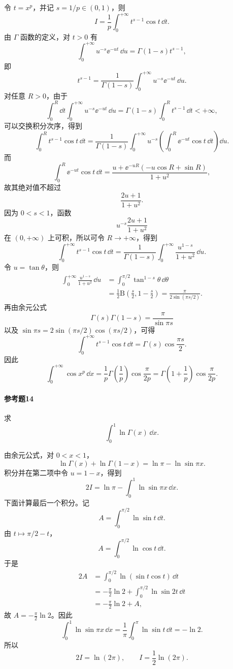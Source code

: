 \begin{xsolution}
令 $t=x^p$，并记 $s=1/p\in(0,1)$，则
\[
I=\frac1p\int_0^{+\infty}t^{s-1}\cos t\,\dd t.
\]
由 $\Gamma$ 函数的定义，对 $t>0$ 有
\[
\int_0^{+\infty}u^{-s}\ee^{-ut}\,\dd u
=\Gamma(1-s)t^{s-1},
\]
即
\[
t^{s-1}=\frac1{\Gamma(1-s)}
\int_0^{+\infty}u^{-s}\ee^{-ut}\,\dd u.
\]
对任意 $R>0$，由于
\[
\int_0^R\dd t\int_0^{+\infty}u^{-s}\ee^{-ut}\,\dd u
=\Gamma(1-s)\int_0^R t^{s-1}\,\dd t<+\infty,
\]
可以交换积分次序，得到
\[
\int_0^R t^{s-1}\cos t\,\dd t
=\frac1{\Gamma(1-s)}
\int_0^{+\infty}u^{-s}
\left(\int_0^R\ee^{-ut}\cos t\,\dd t\right)\dd u.
\]
而
\[
\int_0^R\ee^{-ut}\cos t\,\dd t
=\frac{u+\ee^{-uR}(-u\cos R+\sin R)}{1+u^2},
\]
故其绝对值不超过
\[
\frac{2u+1}{1+u^2}.
\]
因为 $0<s<1$，函数
\[
u^{-s}\frac{2u+1}{1+u^2}
\]
在 $(0,+\infty)$ 上可积，所以可令 $R\to+\infty$，得到
\[
\int_0^{+\infty}t^{s-1}\cos t\,\dd t
=\frac1{\Gamma(1-s)}
\int_0^{+\infty}\frac{u^{1-s}}{1+u^2}\,\dd u.
\]
令 $u=\tan\theta$，则
\[
\begin{aligned}
\int_0^{+\infty}\frac{u^{1-s}}{1+u^2}\,\dd u
&=\int_0^{\pi/2}\tan^{1-s}\theta\,\dd\theta\\
&=\frac12\mathrm{B}\left(\frac s2,1-\frac s2\right)
=\frac{\pi}{2\sin(\pi s/2)}.
\end{aligned}
\]
再由余元公式
\[
\Gamma(s)\Gamma(1-s)=\frac\pi{\sin\pi s}
\]
以及 $\sin\pi s=2\sin(\pi s/2)\cos(\pi s/2)$，可得
\[
\int_0^{+\infty}t^{s-1}\cos t\,\dd t
=\Gamma(s)\cos\frac{\pi s}{2}.
\]
因此
\[
\boxed{
\int_0^{+\infty}\cos x^p\,\dd x
=\frac1p\Gamma\left(\frac1p\right)
\cos\frac\pi{2p}
=\Gamma\left(1+\frac1p\right)\cos\frac\pi{2p}.}
\]
\end{xsolution}

\paragraph{参考题14}
求
\[
\int_0^1\ln\Gamma(x)\,\dd x.
\]

\begin{xsolution}
由余元公式，对 $0<x<1$，
\[
\ln\Gamma(x)+\ln\Gamma(1-x)
=\ln\pi-\ln\sin\pi x.
\]
积分并在第二项中令 $u=1-x$，得到
\[
2I=\ln\pi-\int_0^1\ln\sin\pi x\,\dd x.
\]
下面计算最后一个积分。记
\[
A=\int_0^{\pi/2}\ln\sin t\,\dd t.
\]
由 $t\mapsto\pi/2-t$，
\[
A=\int_0^{\pi/2}\ln\cos t\,\dd t.
\]
于是
\[
\begin{aligned}
2A
&=\int_0^{\pi/2}\ln(\sin t\cos t)\,\dd t\\
&=-\frac\pi2\ln2+
\int_0^{\pi/2}\ln\sin2t\,\dd t\\
&=-\frac\pi2\ln2+A,
\end{aligned}
\]
故 $A=-\frac\pi2\ln2$。因此
\[
\int_0^1\ln\sin\pi x\,\dd x
=\frac1\pi\int_0^\pi\ln\sin t\,\dd t=-\ln2.
\]
所以
\[
2I=\ln(2\pi),
\qquad
\boxed{I=\frac12\ln(2\pi)}.
\]
\end{xsolution}

